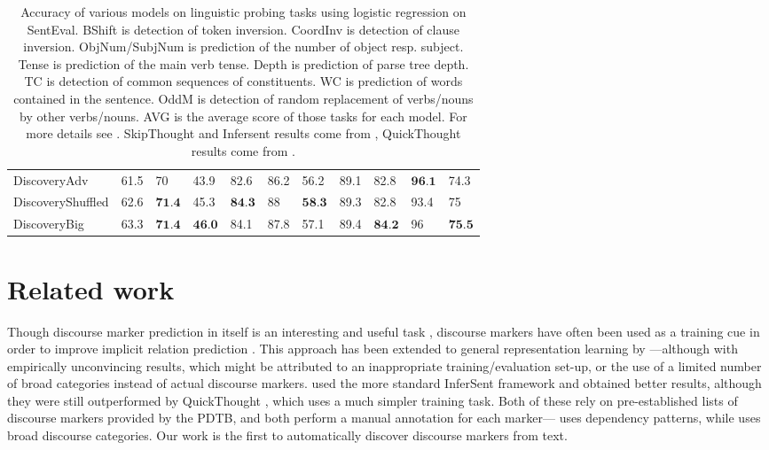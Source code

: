 \documentclass[11pt,a4paper]{article}
\begin{document}
\begin{table*}[htb]
\begin{tabular}{lllllllllll}
DiscoveryAdv      &             61.5 &                    70 &             43.9 &             82.6 &             86.2 &             56.2 &             89.1 &             82.8 &  $\textbf{96.1}$ &             74.3 \\
DiscoveryShuffled &             62.6 &       $\textbf{71.4}$ &             45.3 &  $\textbf{84.3}$ &               88 &  $\textbf{58.3}$ &             89.3 &             82.8 &             93.4 &               75 \\
DiscoveryBig      &             63.3 &       $\textbf{71.4}$ &  $\textbf{46.0}$ &             84.1 &             87.8 &             57.1 &             89.4 &  $\textbf{84.2}$ &               96 &  $\textbf{75.5}$ \\
\bottomrule
\end{tabular}

\caption{
Accuracy of various models on linguistic probing tasks using logistic regression on SentEval.
BShift is detection of token inversion.  CoordInv is detection of clause inversion. ObjNum/SubjNum is prediction of the number of object resp. subject. Tense is prediction of the main verb tense. Depth is prediction of parse tree depth. TC is detection of common sequences of constituents. WC is prediction of words contained in the sentence. OddM is detection of random replacement of verbs/nouns by other verbs/nouns. AVG is the average score of those tasks for each model.
For more details see \citet{ConneauProbe}. SkipThought and Infersent results come from \citet{Perone2018EvaluationOS}, QuickThought results come from \citet{Brahma2018UnsupervisedLO}.}
\label{tab:probe}
\end{table*}
\section{Related work}
Though discourse marker prediction in itself is an interesting and useful task \citep{Malmi2017}, discourse markers have often been used as a training cue in order to improve implicit relation prediction \citep{Marcu2001,Sporleder2005ExploitingLC,Zhou2010,braud-denis:2016:EMNLP2016}.
This approach has been extended to general representation learning by \citet{Jernite2017}---although with empirically unconvincing results, which might be attributed to an inappropriate training/evaluation set-up, or the use of a limited number of broad categories instead of actual discourse markers. \citet{Nie2017} used the more standard InferSent framework and obtained better results, although they were still outperformed by QuickThought \citep{Logeswaran2018}, which uses a much simpler training task. Both of these rely on pre-established lists of discourse markers provided by the PDTB, and both perform a manual annotation for each marker---\citet{Nie2017} uses dependency patterns, while \citet{Jernite2017} uses broad discourse categories. Our work is the first to automatically discover discourse markers from text.
\end{document}
